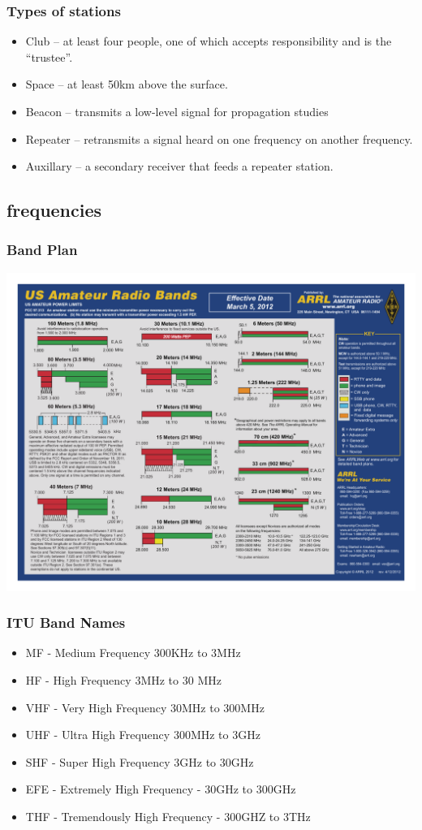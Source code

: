 \documentclass[10pt]{beamer}
\begin{document}
\begin{frame}
\frametitle{Types of stations}
\begin{itemize}
\item Club – at least four  people, one of which accepts responsibility and is the “trustee”.
\item Space – at least 50km above the surface.
\item Beacon --  transmits a low-level signal for propagation studies
\item Repeater – retransmits  a signal heard on one frequency on another frequency.
\item Auxillary – a secondary receiver that feeds a repeater station.  
\end{itemize}
\end{frame}

\subsection{frequencies}

\begin{frame}
\frametitle{Band Plan}
\begin{center}
\includegraphics[width=\textwidth]{hambandscolor.pdf}
\end{center}
\end{frame}

\begin{frame}
\frametitle{ITU Band Names}
\begin{itemize}
\item MF - Medium Frequency 300KHz to 3MHz
\item HF - High Frequency 3MHz to 30 MHz
\item VHF - Very High Frequency 30MHz to 300MHz
\item UHF - Ultra High Frequency 300MHz to 3GHz
\item SHF - Super High Frequency 3GHz to 30GHz
\item EFE - Extremely High Frequency - 30GHz to 300GHz
\item THF - Tremendously High Frequency - 300GHZ to 3THz
\end{itemize}
\end{frame}
\end{document}
